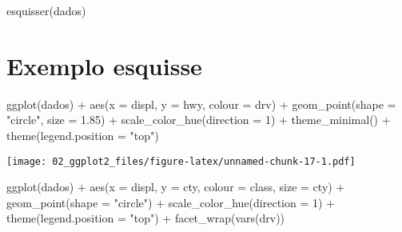\documentclass[
]{book}
\newenvironment{Shaded}{\begin{snugshade}}{\end{snugshade}}
\newcommand{\AttributeTok}[1]{\textcolor[rgb]{0.77,0.63,0.00}{#1}}
\newcommand{\DecValTok}[1]{\textcolor[rgb]{0.00,0.00,0.81}{#1}}
\newcommand{\FloatTok}[1]{\textcolor[rgb]{0.00,0.00,0.81}{#1}}
\newcommand{\FunctionTok}[1]{\textcolor[rgb]{0.00,0.00,0.00}{#1}}
\newcommand{\NormalTok}[1]{#1}
\newcommand{\SpecialCharTok}[1]{\textcolor[rgb]{0.00,0.00,0.00}{#1}}
\newcommand{\StringTok}[1]{\textcolor[rgb]{0.31,0.60,0.02}{#1}}
\begin{document}
\begin{Shaded}
\begin{Highlighting}[]
\FunctionTok{esquisser}\NormalTok{(dados)}
\end{Highlighting}
\end{Shaded}

\hypertarget{exemplo-esquisse}{%
\section{Exemplo esquisse}\label{exemplo-esquisse}}

\begin{Shaded}
\begin{Highlighting}[]
\FunctionTok{ggplot}\NormalTok{(dados) }\SpecialCharTok{+}
  \FunctionTok{aes}\NormalTok{(}\AttributeTok{x =}\NormalTok{ displ, }\AttributeTok{y =}\NormalTok{ hwy, }\AttributeTok{colour =}\NormalTok{ drv) }\SpecialCharTok{+}
  \FunctionTok{geom\_point}\NormalTok{(}\AttributeTok{shape =} \StringTok{"circle"}\NormalTok{, }\AttributeTok{size =} \FloatTok{1.85}\NormalTok{) }\SpecialCharTok{+}
  \FunctionTok{scale\_color\_hue}\NormalTok{(}\AttributeTok{direction =} \DecValTok{1}\NormalTok{) }\SpecialCharTok{+}
  \FunctionTok{theme\_minimal}\NormalTok{() }\SpecialCharTok{+}
  \FunctionTok{theme}\NormalTok{(}\AttributeTok{legend.position =} \StringTok{"top"}\NormalTok{)}
\end{Highlighting}
\end{Shaded}

\texttt{[image: 02\_ggplot2\_files/figure-latex/unnamed-chunk-17-1.pdf]}

\begin{Shaded}
\begin{Highlighting}[]
\FunctionTok{ggplot}\NormalTok{(dados) }\SpecialCharTok{+}
  \FunctionTok{aes}\NormalTok{(}\AttributeTok{x =}\NormalTok{ displ, }\AttributeTok{y =}\NormalTok{ cty, }\AttributeTok{colour =}\NormalTok{ class, }\AttributeTok{size =}\NormalTok{ cty) }\SpecialCharTok{+}
  \FunctionTok{geom\_point}\NormalTok{(}\AttributeTok{shape =} \StringTok{"circle"}\NormalTok{) }\SpecialCharTok{+}
  \FunctionTok{scale\_color\_hue}\NormalTok{(}\AttributeTok{direction =} \DecValTok{1}\NormalTok{) }\SpecialCharTok{+}
  \FunctionTok{theme}\NormalTok{(}\AttributeTok{legend.position =} \StringTok{"top"}\NormalTok{) }\SpecialCharTok{+}
  \FunctionTok{facet\_wrap}\NormalTok{(}\FunctionTok{vars}\NormalTok{(drv))}
\end{Highlighting}
\end{Shaded}
\end{document}

